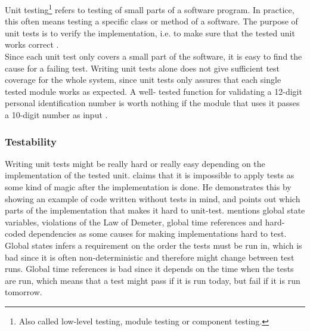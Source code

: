 \MakeShortVerb{\|}


Unit testing\footnote{Also called low-level testing, module testing or
component testing.} refers to testing of small parts of a software
program. In practice, this often means testing a specific class or
method of a software. The purpose of unit tests is to verify the
implementation, i.e. to make sure that the tested unit works correct
\cite{book:pfleeger}.\\

Since each unit test only covers a small part of the software, it is
easy to find the cause for a failing test. Writing unit tests alone does
not give sufficient test coverage for the whole system, since unit
tests only assures that each single tested module works as expected. A
well- tested function for validating a 12-digit personal identification
number is worth nothing if the module that uses it passes a 10-digit
number as input \cite{wiki:unittests}.\\


\subsubsection{Testability}

Writing unit tests might be really hard or really easy depending on the
implementation of the tested unit. \citet{video:misko_psychology} claims
that it is impossible to apply tests as some kind of magic after the
implementation is done. He demonstrates this by showing an example of
code written without tests in mind, and points out which parts of the
implementation that makes it hard to unit-test.
\citeauthor{video:misko_psychology} mentions global state variables,
violations of the Law of Demeter, global time references
and hard-coded dependencies as some causes for making implementations
hard to test.\\

Global states infers a requirement on the order the tests
must be run in, which is bad since it is often non-deterministic and
therefore might change between test runs. Global time references is bad
since it depends on the time when the tests are run, which means that a
test might pass if it is run today, but fail if it is run tomorrow.\\

